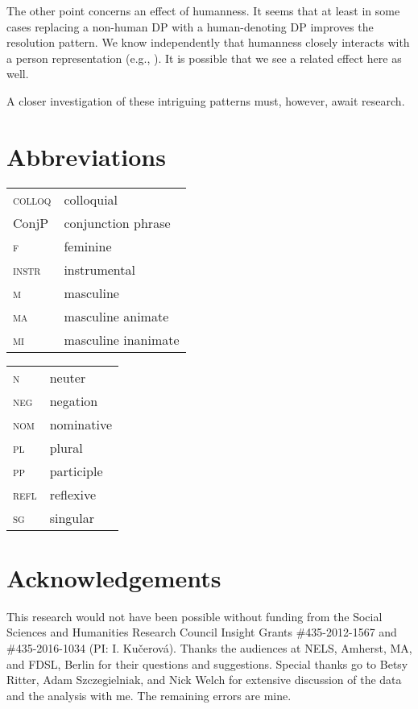 \documentclass[output=paper,modfontsnewtxmath,hidelinks]{langscibook}
\begin{document}
The other point concerns an effect of humanness. It seems that at least in some cases replacing  a non-human  DP with a human-denoting  DP improves the resolution pattern. We know independently that humanness closely interacts with a person representation (e.g., \citealt{Ritter2014, Wiltschko2015}). It is possible that we see a related effect here as well.

A closer investigation of these intriguing patterns must, however, await  research.


\section*{Abbreviations}

\begin{tabularx}{.5\textwidth}{@{}lQ@{}}
\textsc{colloq}&colloquial\\
ConjP&{conjunction phrase}\\
\textsc{f}&{feminine}\\
\textsc{instr}&{instrumental}\\
\textsc{m}&{masculine}\\
\textsc{ma}&{masculine} {animate}\\
\textsc{mi}&{masculine} {inanimate}\\
\end{tabularx}%
\begin{tabularx}{.5\textwidth}{@{}lQ@{}}
\textsc{n}&{neuter}\\
\textsc{neg}&{negation}\\
\textsc{nom}&{nominative}\\
\textsc{pl}&{plural}\\
\textsc{pp}&{participle}\\
\textsc{refl}&reflexive\\
\textsc{sg}&singular\\
\end{tabularx}

\section*{Acknowledgements}
This research would not have been possible without funding from the Social Sciences and Humanities Research Council Insight Grants \#435-2012-1567 and \#435-2016-1034  (PI: I. Kučerová). Thanks the audiences at NELS, Amherst, MA, and FDSL, Berlin for their questions and suggestions. Special thanks go to Betsy Ritter, Adam Szczegielniak, and Nick Welch for extensive discussion of the data and the analysis with me. The remaining errors are mine.

\sloppy
\printbibliography[heading=subbibliography,notkeyword=this]
\clearpage 
\end{document}
